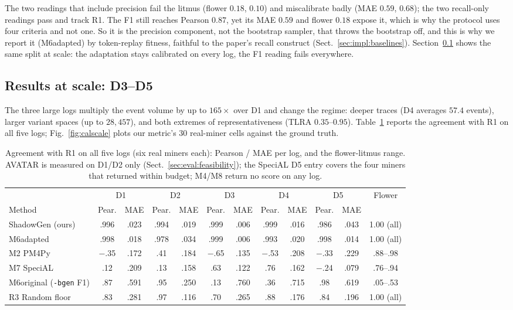 \documentclass[runningheads]{llncs}
\newcommand{\chg}[1]{\textcolor{chgblue}{#1}}
\begin{document}
The two readings that include precision fail the litmus (flower $0.18$, $0.10$) and miscalibrate badly (MAE $0.59$, $0.68$); the two recall-only readings pass and track R1. The F1 still reaches Pearson $0.87$, yet its MAE $0.59$ and flower $0.18$ expose it, which is why the protocol uses four criteria and not one. So it is the precision component, not the bootstrap sampler, that throws the bootstrap off, and this is why we report it (M6adapted) by token-replay fitness, faithful to the paper's recall construct (Sect.~\ref{sec:impl:baselines}). \chg{Section~\ref{sec:eval:scale} shows the same split at scale: the adaptation stays calibrated on every log, the F1 reading fails everywhere.}

{\color{chgblue}
\subsection{Results at scale: D3--D5}
\label{sec:eval:scale}
The three large logs multiply the event volume by up to $165\times$ over D1 and change the regime: deeper traces (D4 averages $57.4$ events), larger variant spaces (up to $28{,}457$), and both extremes of representativeness (TLRA $0.35$--$0.95$). Table~\ref{tab:scale} reports the agreement with R1 on all five logs; Fig.~\ref{fig:calscale} plots our metric's 30 real-miner cells against the ground truth.

\begin{table}[t]
\centering
\caption{Agreement with R1 on all five logs (six real miners each): Pearson / MAE per log, and the flower-litmus range. AVATAR is measured on D1/D2 only (Sect.~\ref{sec:eval:feasibility}); the SpeciAL D5 entry covers the four miners that returned within budget; M4/M8 return no score on any log.}
\label{tab:scale}
\setlength{\tabcolsep}{2.2pt}
\scriptsize
\begin{tabular}{@{}l cc cc cc cc cc c@{}}
\toprule
 & \multicolumn{2}{c}{D1} & \multicolumn{2}{c}{D2} & \multicolumn{2}{c}{D3} & \multicolumn{2}{c}{D4} & \multicolumn{2}{c}{D5} & Flower \\
\cmidrule(lr){2-3}\cmidrule(lr){4-5}\cmidrule(lr){6-7}\cmidrule(lr){8-9}\cmidrule(lr){10-11}
Method & Pear. & MAE & Pear. & MAE & Pear. & MAE & Pear. & MAE & Pear. & MAE & \\
\midrule
ShadowGen (ours) & .996 & .023 & .994 & .019 & .999 & .006 & .999 & .016 & .986 & .043 & 1.00 (all) \\
M6adapted & .998 & .018 & .978 & .034 & .999 & .006 & .993 & .020 & .998 & .014 & 1.00 (all) \\
M2 PM4Py & $-$.35 & .172 & .41 & .184 & $-$.65 & .135 & $-$.53 & .208 & $-$.33 & .229 & .88--.98 \\
M7 SpeciAL & .12 & .209 & .13 & .158 & .63 & .122 & .76 & .162 & $-$.24 & .079 & .76--.94 \\
M6original (\texttt{-bgen} F1) & .87 & .591 & .95 & .250 & .13 & .760 & .36 & .715 & .98 & .619 & .05--.53 \\
R3 Random floor & .83 & .281 & .97 & .116 & .70 & .265 & .88 & .176 & .84 & .196 & 1.00 (all) \\
\bottomrule
\end{tabular}
\end{table}

}
\end{document}
